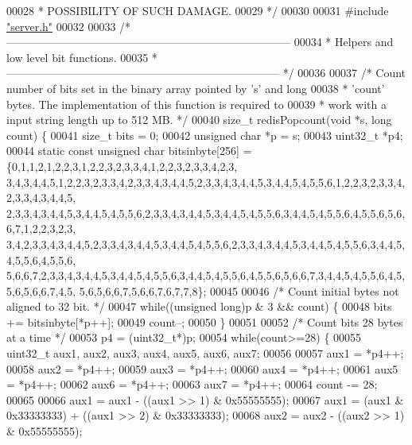 \begin{DoxyCode}
00028 \textcolor{comment}{ * POSSIBILITY OF SUCH DAMAGE.}
00029 \textcolor{comment}{ */}
00030 
00031 \textcolor{preprocessor}{#}\textcolor{preprocessor}{include} \hyperlink{server_8h}{"server.h"}
00032 
00033 \textcolor{comment}{/* -----------------------------------------------------------------------------}
00034 \textcolor{comment}{ * Helpers and low level bit functions.}
00035 \textcolor{comment}{ * -------------------------------------------------------------------------- */}
00036 
00037 \textcolor{comment}{/* Count number of bits set in the binary array pointed by 's' and long}
00038 \textcolor{comment}{ * 'count' bytes. The implementation of this function is required to}
00039 \textcolor{comment}{ * work with a input string length up to 512 MB. */}
00040 size\_t redisPopcount(\textcolor{keywordtype}{void} *s, \textcolor{keywordtype}{long} count) \{
00041     size\_t bits = 0;
00042     \textcolor{keywordtype}{unsigned} \textcolor{keywordtype}{char} *p = s;
00043     uint32\_t *p4;
00044     \textcolor{keyword}{static} \textcolor{keyword}{const} \textcolor{keywordtype}{unsigned} \textcolor{keywordtype}{char} bitsinbyte[256] = \{0,1,1,2,1,2,2,3,1,2,2,3,2,3,3,4,1,2,2,3,2,3,3,4,2,3,
      3,4,3,4,4,5,1,2,2,3,2,3,3,4,2,3,3,4,3,4,4,5,2,3,3,4,3,4,4,5,3,4,4,5,4,5,5,6,1,2,2,3,2,3,3,4,2,3,3,4,3,4,4,5,
      2,3,3,4,3,4,4,5,3,4,4,5,4,5,5,6,2,3,3,4,3,4,4,5,3,4,4,5,4,5,5,6,3,4,4,5,4,5,5,6,4,5,5,6,5,6,6,7,1,2,2,3,2,3,
      3,4,2,3,3,4,3,4,4,5,2,3,3,4,3,4,4,5,3,4,4,5,4,5,5,6,2,3,3,4,3,4,4,5,3,4,4,5,4,5,5,6,3,4,4,5,4,5,5,6,4,5,5,6,
      5,6,6,7,2,3,3,4,3,4,4,5,3,4,4,5,4,5,5,6,3,4,4,5,4,5,5,6,4,5,5,6,5,6,6,7,3,4,4,5,4,5,5,6,4,5,5,6,5,6,6,7,4,5,
      5,6,5,6,6,7,5,6,6,7,6,7,7,8\};
00045 
00046     \textcolor{comment}{/* Count initial bytes not aligned to 32 bit. */}
00047     \textcolor{keywordflow}{while}((\textcolor{keywordtype}{unsigned} \textcolor{keywordtype}{long})p & 3 && count) \{
00048         bits += bitsinbyte[*p++];
00049         count--;
00050     \}
00051 
00052     \textcolor{comment}{/* Count bits 28 bytes at a time */}
00053     p4 = (uint32\_t*)p;
00054     \textcolor{keywordflow}{while}(count>=28) \{
00055         uint32\_t aux1, aux2, aux3, aux4, aux5, aux6, aux7;
00056 
00057         aux1 = *p4++;
00058         aux2 = *p4++;
00059         aux3 = *p4++;
00060         aux4 = *p4++;
00061         aux5 = *p4++;
00062         aux6 = *p4++;
00063         aux7 = *p4++;
00064         count -= 28;
00065 
00066         aux1 = aux1 - ((aux1 >> 1) & 0x55555555);
00067         aux1 = (aux1 & 0x33333333) + ((aux1 >> 2) & 0x33333333);
00068         aux2 = aux2 - ((aux2 >> 1) & 0x55555555);

\end{DoxyCode}
